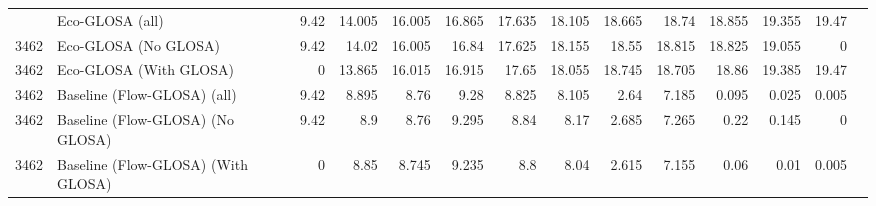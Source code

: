 \begin{table}[ht]
{\begin{tabular}{llrrrrrrrrrrrr}
        \addlinespace
        3462 & Eco-GLOSA (all)                    & 9.42 & 14.005 & 16.005 & 16.865 & 17.635 & 18.105 & 18.665 & 18.74 & 18.855 & 19.355 & 19.47 \\
        3462 & Eco-GLOSA (No GLOSA)               & 9.42 & 14.02 & 16.005 & 16.84 & 17.625 & 18.155 & 18.55 & 18.815 & 18.825 & 19.055 & 0 \\
        3462 & Eco-GLOSA (With GLOSA)             & 0 & 13.865 & 16.015 & 16.915 & 17.65 & 18.055 & 18.745 & 18.705 & 18.86 & 19.385 & 19.47 \\
        3462 & Baseline (Flow-GLOSA) (all)        & 9.42 & 8.895 & 8.76 & 9.28 & 8.825 & 8.105 & 2.64 & 7.185 & 0.095 & 0.025 & 0.005 \\
        3462 & Baseline (Flow-GLOSA) (No GLOSA)   & 9.42 & 8.9 & 8.76 & 9.295 & 8.84 & 8.17 & 2.685 & 7.265 & 0.22 & 0.145 & 0 \\
        3462 & Baseline (Flow-GLOSA) (With GLOSA) & 0 & 8.85 & 8.745 & 9.235 & 8.8 & 8.04 & 2.615 & 7.155 & 0.06 & 0.01 & 0.005 \\
        \bottomrule
      \end{tabular}
    }
\end{table}
